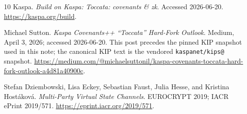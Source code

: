 \documentclass[10pt,a4paper]{article}
\begin{document}
\begin{thebibliography}{10}
Kaspa.
\newblock \emph{Build on Kaspa: Toccata: covenants \& zk}.
\newblock Accessed 2026-06-20.
\newblock \url{https://kaspa.org/build}.

Michael Sutton.
\newblock \emph{Kaspa Covenants++ ``Toccata'' Hard-Fork Outlook}.
\newblock Medium, April 3, 2026; accessed 2026-06-20.
\newblock This post precedes the pinned KIP snapshot used in this note; the canonical KIP text is the vendored \texttt{kaspanet/kips@\kipsnapshot} snapshot.
\newblock \url{https://medium.com/@michaelsuttonil/kaspa-covenants-toccata-hard-fork-outlook-a4d81a40900c}.

Stefan Dziembowski, Lisa Eckey, Sebastian Faust, Julia Hesse, and Kristina Hostáková.
\newblock \emph{Multi-Party Virtual State Channels}.
\newblock EUROCRYPT 2019; IACR ePrint 2019/571.
\newblock \url{https://eprint.iacr.org/2019/571}.

\end{thebibliography}
\end{document}
